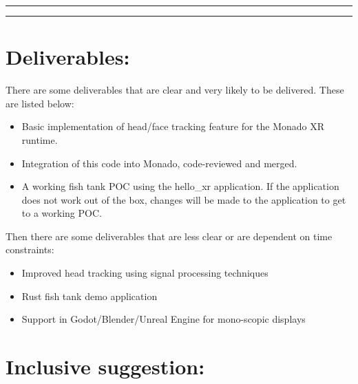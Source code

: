 \begin{normalsize}
\begin{table}[H]
\centering
\begin{minipage}[t]{.7\linewidth}
\rule{\linewidth}{1pt}
\bigskip
\rule{\linewidth}{1pt}%
\end{minipage}%
\end{table}

\vspace*{-0.5cm}
\section{Deliverables:}

There are some deliverables that are clear and very likely to be delivered. These
are listed below:

\begin{itemize}
\setlength\itemsep{-0.1em}
\item Basic implementation of head/face tracking feature for the Monado XR runtime.
\item Integration of this code into Monado, code-reviewed and merged.
\item A working fish tank POC using the hello\_xr application. If the
application does not work out of the box, changes will be made to the application
to get to a working POC.
\end{itemize}

\noindent
Then there are some deliverables that are less clear or are dependent on time
constraints:

\begin{itemize}
\setlength\itemsep{-0.1em}
\item Improved head tracking using signal processing techniques
\item Rust fish tank demo application
\item Support in Godot/Blender/Unreal Engine for mono-scopic displays
\end{itemize}

\vspace*{-0.5cm}
\section{Inclusive suggestion:}


\end{normalsize}
